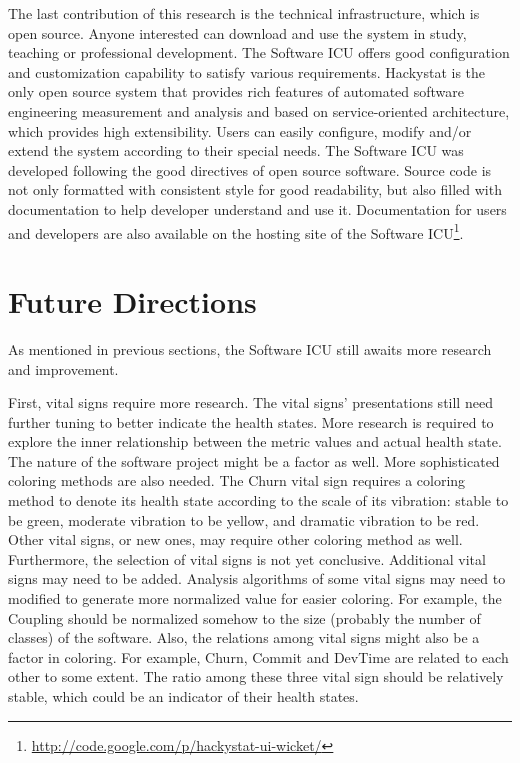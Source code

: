 The last contribution of this research is the technical infrastructure, which is open source. Anyone interested can download and use the system in study, teaching or professional development. The Software ICU offers good configuration and customization capability to satisfy various requirements. Hackystat is the only open source system that provides rich features of automated software engineering measurement and analysis and based on service-oriented architecture, which provides high extensibility. Users can easily configure, modify and/or extend the system according to their special needs. The Software ICU was developed following the good directives of open source software. Source code is not only formatted with consistent style for good readability, but also filled with documentation to help developer understand and use it. Documentation for users and developers are also available on the hosting site of the Software ICU\footnote{\url{http://code.google.com/p/hackystat-ui-wicket/}}.


\section{Future Directions}
As mentioned in previous sections, the Software ICU still awaits more research and improvement.

First, vital signs require more research. The vital signs' presentations still need further tuning to better indicate the health states. More research is required to explore the inner relationship between the metric values and actual health state. The nature of the software project might be a factor as well. More sophisticated coloring methods are also needed. The Churn vital sign requires a coloring method to denote its health state according to the scale of its vibration: stable to be green, moderate vibration to be yellow, and dramatic vibration to be red. Other vital signs, or new ones, may require other coloring method as well. Furthermore, the selection of vital signs is not yet conclusive. Additional vital signs may need to be added. Analysis algorithms of some vital signs may need to modified to generate more normalized value for easier coloring. For example, the Coupling should be normalized somehow to the size (probably the number of classes) of the software. Also, the relations among vital signs might also be a factor in coloring. For example, Churn, Commit and DevTime are related to each other to some extent. The ratio among these three vital sign should be relatively stable, which could be an indicator of their health states.


